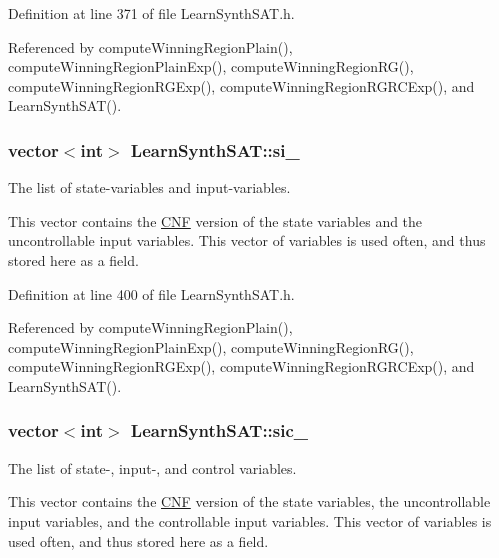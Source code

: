 Definition at line 371 of file Learn\-Synth\-S\-A\-T.\-h.



Referenced by compute\-Winning\-Region\-Plain(), compute\-Winning\-Region\-Plain\-Exp(), compute\-Winning\-Region\-R\-G(), compute\-Winning\-Region\-R\-G\-Exp(), compute\-Winning\-Region\-R\-G\-R\-C\-Exp(), and Learn\-Synth\-S\-A\-T().

\hypertarget{classLearnSynthSAT_a49633abdda013c437cad8f25914eeb1f}{
\subsubsection[{si\-\_\-}]{\setlength{\rightskip}{0pt plus 5cm}vector$<$int$>$ Learn\-Synth\-S\-A\-T\-::si\-\_\-\hspace{0.3cm}{\ttfamily [protected]}}}\label{classLearnSynthSAT_a49633abdda013c437cad8f25914eeb1f}


The list of state-\/variables and input-\/variables. 

This vector contains the \hyperlink{classCNF}{C\-N\-F} version of the state variables and the uncontrollable input variables. This vector of variables is used often, and thus stored here as a field. 

Definition at line 400 of file Learn\-Synth\-S\-A\-T.\-h.



Referenced by compute\-Winning\-Region\-Plain(), compute\-Winning\-Region\-Plain\-Exp(), compute\-Winning\-Region\-R\-G(), compute\-Winning\-Region\-R\-G\-Exp(), compute\-Winning\-Region\-R\-G\-R\-C\-Exp(), and Learn\-Synth\-S\-A\-T().

\hypertarget{classLearnSynthSAT_af771f52e55a36e1d685aa198a1942cd8}{
\subsubsection[{sic\-\_\-}]{\setlength{\rightskip}{0pt plus 5cm}vector$<$int$>$ Learn\-Synth\-S\-A\-T\-::sic\-\_\-\hspace{0.3cm}{\ttfamily [protected]}}}\label{classLearnSynthSAT_af771f52e55a36e1d685aa198a1942cd8}


The list of state-\/, input-\/, and control variables. 

This vector contains the \hyperlink{classCNF}{C\-N\-F} version of the state variables, the uncontrollable input variables, and the controllable input variables. This vector of variables is used often, and thus stored here as a field. 

